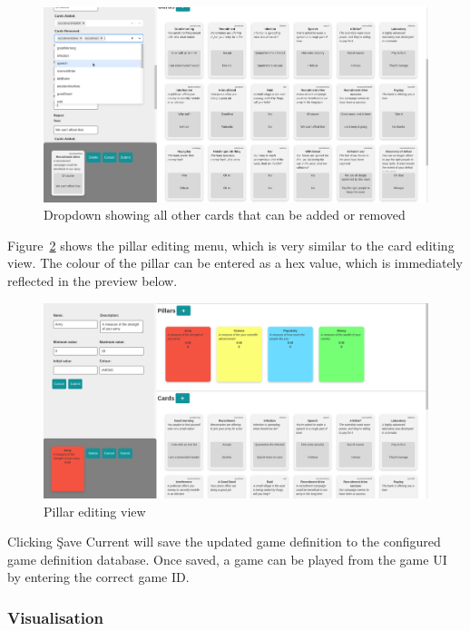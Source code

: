 \begin{figure}[!h]
	\centering
	\includegraphics[width=1.0\textwidth]{./images/design/add_card.png}
	\caption{Dropdown showing all other cards that can be added or removed}
	\label{fig:add_card}
\end{figure}

Figure~\ref{fig:pillar_edit} shows the pillar editing menu, which is very similar to the card editing view. The colour of the pillar can be entered as a hex value, which is immediately reflected in the preview below.

\begin{figure}[!h]
	\centering
	\includegraphics[width=1.0\textwidth]{./images/design/pillar_edit.png}
	\caption{Pillar editing view}
	\label{fig:pillar_edit}
\end{figure}

Clicking \c{Save Current} will save the updated game definition to the configured game definition database. Once saved, a game can be played from the game UI by entering the correct game ID.

\subsubsection{Visualisation}

